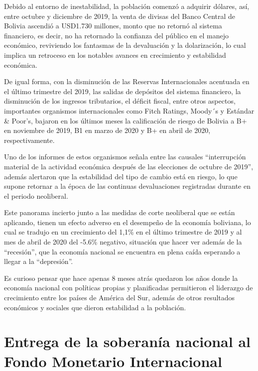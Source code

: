 \documentclass[a4paper, nobind]{templates/ociamthesis}
\begin{document}
\begin{itemize}
  Debido al entorno de inestabilidad, la población comenzó a adquirir dólares, así, entre octubre y diciembre de 2019, la venta de divisas del Banco Central de Bolivia ascendió a USD1.730 millones, monto que no retornó al sistema financiero, es decir, no ha retornado la confianza del público en el manejo económico, reviviendo los fantasmas de la devaluación y la dolarización, lo cual implica un retroceso en los notables avances en crecimiento y estabilidad económica.

  De igual forma, con la disminución de las Reservas Internacionales acentuada en el último trimestre del 2019, las salidas de depósitos del sistema financiero, la disminución de los ingresos tributarios, el déficit fiscal, entre otros aspectos, importantes organismos internacionales como Fitch Ratings, Moody´s y Estándar \& Poor's, bajaron en los últimos meses la calificación de riesgo de Bolivia a B+ en noviembre de 2019, B1 en marzo de 2020 y B+ en abril de 2020, respectivamente.

  Uno de los informes de estos organismos señala entre las causales ``interrupción material de la actividad económica después de las elecciones de octubre de 2019'', además alertaron que la estabilidad del tipo de cambio está en riesgo, lo que supone retornar a la época de las continuas devaluaciones registradas durante en el periodo neoliberal.

  Este panorama incierto junto a las medidas de corte neoliberal que se están aplicando, tienen un efecto adverso en el desempeño de la economía boliviana, lo cual se tradujo en un crecimiento del 1,1\% en el último trimestre de 2019 y al mes de abril de 2020 del -5.6\% negativo, situación que hacer ver además de la ``recesión'', que la economía nacional se encuentra en plena caída esperando a llegar a la ``depresión''.

  Es curioso pensar que hace apenas 8 meses atrás quedaron los años donde la economía nacional con políticas propias y planificadas permitieron el liderazgo de crecimiento entre los países de América del Sur, además de otros resultados económicos y sociales que dieron estabilidad a la población.
\end{itemize}

\hypertarget{entrega-de-la-soberanuxeda-nacional-al-fondo-monetario-internacional}{%
\section{Entrega de la soberanía nacional al Fondo Monetario Internacional}\label{entrega-de-la-soberanuxeda-nacional-al-fondo-monetario-internacional}}
\end{document}
